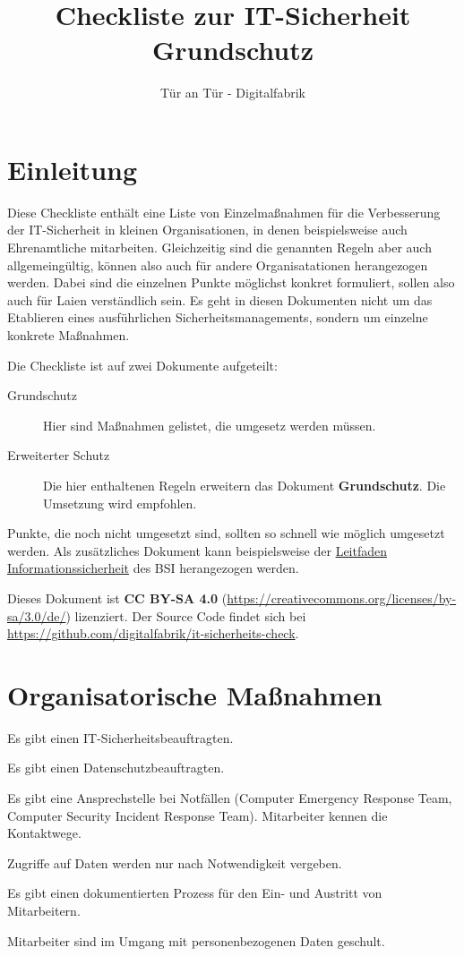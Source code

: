 \documentclass[10pt,a4paper]{article}
\begin{document}
\title{%
  Checkliste zur IT-Sicherheit \\
  \large Grundschutz}
\author{Tür an Tür - Digitalfabrik}
\maketitle
\section{Einleitung}
Diese Checkliste enthält eine Liste von Einzelmaßnahmen für die Verbesserung der IT-Sicherheit in kleinen Organisationen, in denen beispielsweise auch Ehrenamtliche mitarbeiten. Gleichzeitig sind die genannten Regeln aber auch allgemeingültig, können also auch für andere Organisatationen herangezogen werden. Dabei sind die einzelnen Punkte möglichst konkret formuliert, sollen also auch für Laien verständlich sein. Es geht in diesen Dokumenten nicht um das Etablieren eines ausführlichen Sicherheitsmanagements, sondern um einzelne konkrete Maßnahmen.

Die Checkliste ist auf zwei Dokumente aufgeteilt:

\begin{description}
\item [Grundschutz]{Hier sind Maßnahmen gelistet, die umgesetz werden müssen.}
\item[Erweiterter Schutz]{Die hier enthaltenen Regeln erweitern das Dokument \textbf{Grundschutz}. Die Umsetzung wird empfohlen.}
\end{description}

Punkte, die noch nicht umgesetzt sind, sollten so schnell wie möglich umgesetzt werden. Als zusätzliches Dokument kann beispielsweise der \href{https://www.bsi.bund.de/SharedDocs/Downloads/DE/BSI/Grundschutz/Leitfaden/GS-Leitfaden_pdf.pdf}{Leitfaden Informationssicherheit} des BSI herangezogen werden.

Dieses Dokument ist \textbf{CC BY-SA 4.0} (\url{https://creativecommons.org/licenses/by-sa/3.0/de/}) lizenziert. Der Source Code findet sich bei \url{https://github.com/digitalfabrik/it-sicherheits-check}.

\section{Organisatorische Maßnahmen}
\begin{todolist}
\item{Es gibt einen IT-Sicherheitsbeauftragten.}
\item{Es gibt einen Datenschutzbeauftragten.}
\item{Es gibt eine Ansprechstelle bei Notfällen (Computer Emergency Response Team, Computer Security Incident Response Team). Mitarbeiter kennen die Kontaktwege.}
\item{Zugriffe auf Daten werden nur nach Notwendigkeit vergeben.}
\item{Es gibt einen dokumentierten Prozess für den Ein- und Austritt von Mitarbeitern.}
\item{Mitarbeiter sind im Umgang mit personenbezogenen Daten geschult.}
\end{todolist}
\end{document}
